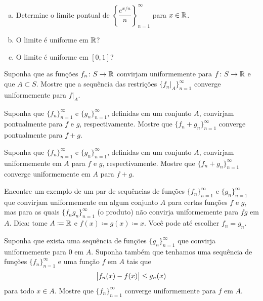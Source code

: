 \begin{exercise}
\leavevmode
\begin{enumerate}[a)]
\item
Determine o limite pontual de
$\left\{ \dfrac{e^{x/n}}{n} \right\}_{n=1}^\infty$ para $x \in {\mathbb{R}}$.
\item
O limite é uniforme em ${\mathbb{R}}$?
\item
O limite é uniforme em $[0,1]$?
\end{enumerate}
\end{exercise}

\begin{exercise}
Suponha que as funções $f_n \colon S \to {\mathbb{R}}$ convirjam uniformemente
para $f \colon S \to {\mathbb{R}}$ e que $A \subset S$. Mostre que a sequência das
restrições $\{ f_n|_A \}_{n=1}^\infty$ converge uniformemente para $f|_A$.
\end{exercise}

\begin{exercise}
Suponha que $\{ f_n \}_{n=1}^\infty$ e $\{ g_n \}_{n=1}^\infty$, definidas
em um conjunto $A$, convirjam pontualmente para $f$ e $g$, respectivamente.
Mostre que $\{ f_n+g_n \}_{n=1}^\infty$ converge pontualmente para $f+g$.
\end{exercise}

\begin{exercise}
Suponha que $\{ f_n \}_{n=1}^\infty$ e $\{ g_n \}_{n=1}^\infty$, definidas
em um conjunto $A$, convirjam uniformemente em $A$ para $f$ e $g$,
respectivamente. Mostre que $\{ f_n+g_n \}_{n=1}^\infty$ converge
uniformemente em $A$ para $f+g$.
\end{exercise}

\begin{exercise}
Encontre um exemplo de um par de sequências de funções $\{ f_n \}_{n=1}^\infty$ e
$\{ g_n \}_{n=1}^\infty$
que convirjam uniformemente em algum conjunto $A$ para certas funções $f$
e $g$, mas para as quais $\{ f_ng_n \}_{n=1}^\infty$ (o produto) não
convirja uniformemente para $fg$ em $A$. Dica: tome $A \coloneqq {\mathbb{R}}$ e
$f(x)\coloneqq g(x) \coloneqq x$. Você pode até escolher $f_n = g_n$.
\end{exercise}

\begin{exercise}
Suponha que exista uma sequência de funções $\{ g_n \}_{n=1}^\infty$ que
convirja uniformemente para $0$ em $A$. Suponha também que tenhamos uma
sequência de funções $\{ f_n \}_{n=1}^\infty$ e uma função $f$ em $A$ tais que
\begin{equation*}
\bigl\lvert {f_n(x) - f(x)} \bigr\rvert \leq g_n(x) 
\end{equation*}
para todo $x \in A$. Mostre que $\{ f_n \}_{n=1}^\infty$ converge
uniformemente para $f$ em $A$.
\end{exercise}

